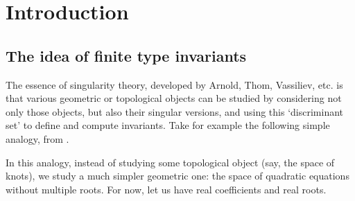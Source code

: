 \chapter*{Introduction}

\section*{The idea of finite type invariants}

The essence of singularity theory, developed by Arnold, Thom, Vassiliev, etc. is that various geometric or topological objects can be studied by considering not only those objects, but also their singular versions, and using this `discriminant set' to define and compute invariants. Take for example the following simple analogy, from \cite{knots-links-and-their-invariants}.

In this analogy, instead of studying some topological object (say, the space of knots), we study a much simpler geometric one: the space of quadratic equations without multiple roots. For now, let us have real coefficients and real roots.

